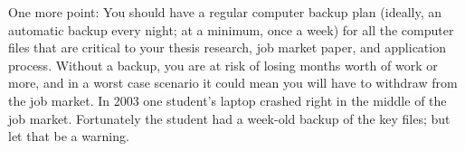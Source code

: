 \documentclass{\classes/econtex}
\begin{document}
One more point: You should have a regular computer backup plan
(ideally, an automatic backup every night; at a minimum, once a week)
for all the computer files that are critical to your thesis research,
job market paper, and application process.  Without a backup, you are
at risk of losing months worth of work or more, and in a worst case
scenario it could mean you will have to withdraw from the job market.
In 2003 one student's laptop crashed right in the middle of the job
market.  Fortunately the student had a week-old backup of the key
files; but let that be a warning.

\pagebreak

\normalsize
\end{document}
